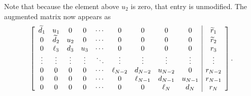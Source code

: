 Note that because the element above $u_2$ is zero, that entry is unmodified. The augmented matrix now appears as
\begin{align}
  \left[ \begin{array}{c c c c c c c c c | c} 
  \widetilde{d}_{1}    & u_{1}    & 0      & 0      & \cdots & 0          & 0          & 0        & 0       & \widetilde{r}_1	  \\
  0		   & \widetilde{d}_{2}    & u_{2}  & 0      & \cdots & 0          & 0          & 0        & 0       & \widetilde{r}_2	  \\
  0        & \ell_{3} & d_{3}  & u_{3}  & \cdots & 0          & 0          & 0        & 0       & r_3	  \\
  \vdots   & \vdots   & \vdots & \vdots & \ddots & \vdots     & \vdots     & \vdots   & \vdots  & \vdots  \\
  0        & 0        & 0      & 0      & \cdots & \ell_{N-2} & d_{N-2}    & u_{N-2}  & 0       & r_{N-2} \\
  0        & 0        & 0      & 0      & \cdots & 0		  & \ell_{N-1} & d_{N-1}  & u_{N-1} & r_{N-1} \\ 
  0        & 0        & 0      & 0      & \cdots & 0          & 0          & \ell_{N} & d_{N}   & r_N     \\ 
  \end{array} \right] . \nonumber
\end{align}

